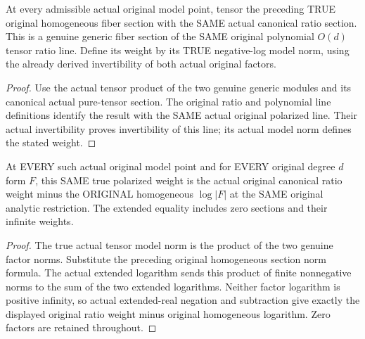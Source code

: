 \begin{definition}
\label{local:actual-full-point-polarized-ratio-section}
\leanok
{}
At every admissible actual original model point, tensor the preceding
TRUE original homogeneous fiber section with the SAME actual canonical
ratio section. This is a genuine generic fiber section of the SAME
original polynomial $O(d)$ tensor ratio line. Define its weight by its
TRUE negative-log model norm, using the already derived invertibility of
both actual original factors.
\end{definition}
\begin{proof}
Use the actual tensor product of the two genuine generic modules and its
canonical actual pure-tensor section. The original ratio and polynomial
line definitions identify the result with the SAME actual original
polarized line. Their actual invertibility proves invertibility of this
line; its actual model norm defines the stated weight.
\end{proof}

\begin{theorem}
\label{local:actual-full-point-polarized-ratio-weight}
\leanok
{}
At EVERY such actual original model point and for EVERY original degree
$d$ form $F$, this SAME true polarized weight is the actual original
canonical ratio weight minus the ORIGINAL homogeneous $\log|F|$ at the
SAME original analytic restriction. The extended equality includes zero
sections and their infinite weights.
\end{theorem}
\begin{proof}
The true actual tensor model norm is the product of the two genuine
factor norms. Substitute the preceding original homogeneous section norm
formula. The actual extended logarithm sends this product of finite
nonnegative norms to the sum of the two extended logarithms. Neither
factor logarithm is positive infinity, so actual extended-real negation
and subtraction give exactly the displayed original ratio weight minus
original homogeneous logarithm. Zero factors are retained throughout.
\end{proof}
